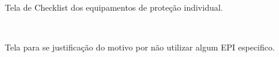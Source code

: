 Tela de Checklist dos equipamentos de proteção individual.
\begin{figure}[htb]
	\centering
	\mbox{%
	}
	
\end{figure}

\newpage

Tela para se justificação do motivo por não utilizar algum EPI especifico.

